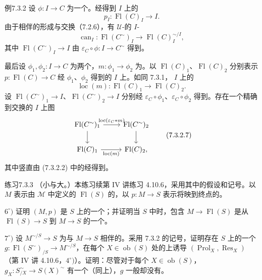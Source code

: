 \begin{SGAresult}{例}{7.3.2}
设 $\phi:I\to C$ 为一个。经得到 $I$ 上的
\[p_I:\operatorname{Fl}(C)_I\longrightarrow I.\tag{7.3.2.4}\]
由于相伴的形成与交换（7.2.6），有 $\mathcal U$-的 $I$-
\[\operatorname{can}_I:\operatorname{Fl}(C^\sim)_I\longrightarrow\operatorname{Fl}(C)_I^{\sim/I},\tag{7.3.2.5}\]
其中 $\operatorname{Fl}(C^\sim)_I\to I$ 由 $\varepsilon_C\circ\phi:I\to C^\sim$ 得到。

最后设 $\phi_1,\phi_2:I\to C$ 为两个，$m:\phi_1\to\phi_2$ 为。以 $\operatorname{Fl}(C)_1$、$\operatorname{Fl}(C)_2$ 分别表示 $p:\operatorname{Fl}(C)\to C$ 经 $\phi_1$、$\phi_2$ 得到的 $I$ 上。如同 7.3.1， $I$ 上的
\[\operatorname{loc}(m):\operatorname{Fl}(C)_1\longrightarrow\operatorname{Fl}(C)_2.\tag{7.3.2.6}\]
设 $\operatorname{Fl}(C^\sim)_1\to I$、$\operatorname{Fl}(C^\sim)_2\to I$ 分别经 $\varepsilon_C\circ\phi_1$、$\varepsilon_C\circ\phi_2$ 得到。存在一个精确到交换的 $I$ 上图
\[\begin{tikzcd}
\operatorname{Fl}(C^\sim)_1\arrow[r,"\operatorname{loc}(\varepsilon_C*m)"]\arrow[d]&\operatorname{Fl}(C^\sim)_2\arrow[d]\\
\operatorname{Fl}(C)_1\arrow[r,"\operatorname{loc}(m)"']&\operatorname{Fl}(C)_2,
\end{tikzcd}\tag{7.3.2.7}\]
其中竖直由 (7.3.2.2) 中的经得到。
\end{SGAresult}
\begin{SGAresult}{练习}{7.3.3}
（小与大。）本练习续第 IV 讲练习 4.10.6，采用其中的假设和记号。以 $M$ 表示由 $\mathcal M$ 中定义的 $\operatorname{Fl}(S)$ 的，以 $p:M\to S$ 表示将映到终点的。

$6^\circ)$ 证明 $(M,p)$ 是 $S$ 上的一个；并证明当 $S$ 中时，包含 $M\to\operatorname{Fl}(S)$ 是从 $\operatorname{Fl}(S)\to S$ 到 $M\to S$ 的一个。

$7^\circ)$ 设 $M^{\sim/S}\to S$ 为与 $M\to S$ 相伴的。采用 7.3.2 的记号，证明存在 $S$ 上的一个 $g:\operatorname{Fl}(S^\sim)_{/S}\to M^{\sim/S}$，在每个 $X\in\operatorname{ob}(S)$ 处的上诱导 $(\operatorname{Prol}_X,\operatorname{Res}_X)$（第 IV 讲 4.10.6，$4^\circ)$）。证明：尽管对于每个 $X\in\operatorname{ob}(S)$， $g_X:S_{/X}^\sim\to S(X)^\sim$ 有一个（同上），$g$ 一般却没有。
\end{SGAresult}
